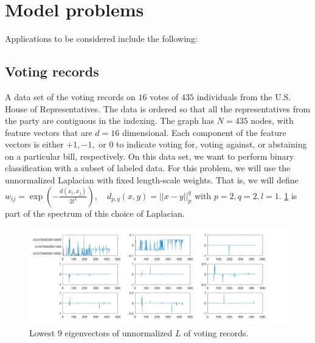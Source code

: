 \documentclass{siamart1116}
\begin{document}
\section{Model problems} \label{sec:model_problems}
    Applications to be considered include the following:
    \subsection{Voting records}
        A data set of the voting records on $16$ votes of $435$ individuals from the U.S. House of Representatives. The data is ordered so that all the representatives from the party are contiguous in the indexing. The graph has $N=435$ nodes, with feature vectors that are $d=16$ dimensional. Each component of the feature vectors is either $+1,-1,$ or $0$ to indicate voting for, voting against, or abstaining on a particular bill, respectively. On this data set, we want to perform binary classification with a subset of labeled data. For this problem, we will use the unnormalized Laplacian with fixed length-scale weights. That is, we will define $w_{ij} = \exp\left({-\frac{d(x_i,x_j)}{2l^2}}\right), \quad d_{p,q}(x,y) = ||x-y||^q_p$ with $p=2,q=2,l=1$. \cref{fig:voting_spec} is part of the spectrum of this choice of Laplacian.

        \begin{figure}[!htb]
        \caption{\label{fig:voting_spec} Lowest $9$ eigenvectors of unnormalized $L$ of voting records.}
        \includegraphics[width=\linewidth]{laplacians/voting_laplacian.png}
        \end{figure}
\end{document}
